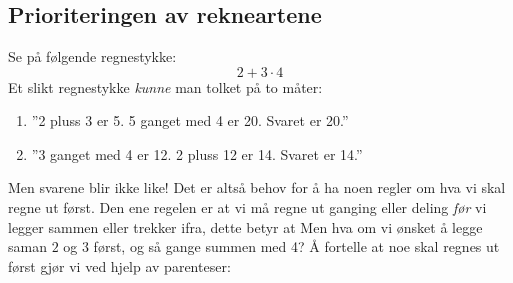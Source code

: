 



\section{\rrek}
\subsection*{Prioriteringen av rekneartene}
Se på følgende regnestykke:
\[ 2+3\cdot4 \]
Et slikt regnestykke \textsl{kunne} man tolket på to måter:
\begin{enumerate}
	\item ''2 pluss 3 er 5. 5 ganget med 4 er 20. Svaret er 20.''
	\item ''3 ganget med 4 er 12. 2 pluss 12 er 14. Svaret er 14.''
\end{enumerate}
Men svarene blir ikke like! Det er altså behov for å ha noen regler om hva vi skal regne ut først. Den ene regelen er at vi må regne ut ganging eller deling \textsl{før} vi legger sammen eller trekker ifra, dette betyr at \regv
\st{ \vs
{}
}
Men hva om vi ønsket å legge saman $ 2 $ og $ 3 $ først, og så gange summen med 4? Å fortelle at noe skal regnes ut først gjør vi ved hjelp av parenteser: \regv
\st{\vs
{}
}\regv

\newpage
{}

